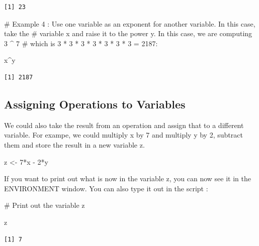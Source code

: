 \documentclass[
  letterpaper,
  DIV=11,
  numbers=noendperiod]{scrreprt}
\newenvironment{Shaded}{\begin{snugshade}}{\end{snugshade}}
\newcommand{\CommentTok}[1]{\textcolor[rgb]{0.37,0.37,0.37}{#1}}
\newcommand{\DecValTok}[1]{\textcolor[rgb]{0.68,0.00,0.00}{#1}}
\newcommand{\NormalTok}[1]{\textcolor[rgb]{0.00,0.23,0.31}{#1}}
\newcommand{\OtherTok}[1]{\textcolor[rgb]{0.00,0.23,0.31}{#1}}
\newcommand{\SpecialCharTok}[1]{\textcolor[rgb]{0.37,0.37,0.37}{#1}}
\begin{document}
\begin{verbatim}
[1] 23
\end{verbatim}

\begin{Shaded}
\begin{Highlighting}[]
\CommentTok{\# Example 4 : Use one variable as an exponent for another variable. In this case, take the }
\CommentTok{\# variable x and raise it to the power y. In this case, we are computing 3 \^{} 7}
\CommentTok{\# which is 3 * 3 * 3 * 3 * 3 * 3 * 3 = 2187:}

\NormalTok{x}\SpecialCharTok{\^{}}\NormalTok{y}
\end{Highlighting}
\end{Shaded}

\begin{verbatim}
[1] 2187
\end{verbatim}

\subsection*{Assigning Operations to
Variables}\label{assigning-operations-to-variables}

We could also take the result from an operation and assign that to a
different variable. For exampe, we could multiply x by 7 and multiply y
by 2, subtract them and store the result in a new variable z.

\begin{Shaded}
\begin{Highlighting}[]
\NormalTok{z }\OtherTok{\textless{}{-}} \DecValTok{7}\SpecialCharTok{*}\NormalTok{x }\SpecialCharTok{{-}} \DecValTok{2}\SpecialCharTok{*}\NormalTok{y}
\end{Highlighting}
\end{Shaded}

If you want to print out what is now in the variable z, you can now see
it in the ENVIRONMENT window. You can also type it out in the script :

\begin{Shaded}
\begin{Highlighting}[]
\CommentTok{\# Print out the variable z}

\NormalTok{z}
\end{Highlighting}
\end{Shaded}

\begin{verbatim}
[1] 7
\end{verbatim}
\end{document}

